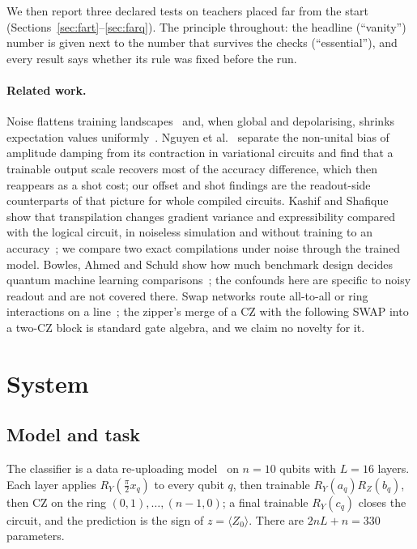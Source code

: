 \documentclass[11pt]{article}
\begin{document}
We then report three declared tests on teachers placed far from the start
(Sections~\ref{sec:fart}--\ref{sec:farq}). The principle throughout: the headline (``vanity'') number is given next to
the number that survives the checks (``essential''), and every result says whether its rule was fixed before the run.

\paragraph{Related work.} Noise flattens training landscapes~\cite{wang2021} and, when global and depolarising,
shrinks expectation values uniformly~\cite{vovrosh2021,urbanek2021}. Nguyen et al.~\cite{nguyen2026} separate the
non-unital bias of amplitude damping from its contraction in variational circuits and find that a trainable output
scale recovers most of the accuracy difference, which then reappears as a shot cost; our offset and shot findings
are the readout-side counterparts of that picture for whole compiled circuits. Kashif and Shafique show that
transpilation changes gradient variance and expressibility compared with the logical circuit, in noiseless
simulation and without training to an accuracy~\cite{kashif2026a,kashif2026b}; we compare two exact compilations
under noise through the trained model. Bowles, Ahmed and Schuld show how much benchmark design decides quantum machine
learning comparisons~\cite{bowles2024}; the confounds here are specific to noisy readout and are not covered there.
Swap networks route all-to-all or ring interactions on a line~\cite{ogorman2019,parella2025}; the zipper's merge of a
CZ with the following SWAP into a two-CZ block is standard gate algebra, and we claim no novelty for it.

\section{System}

\subsection{Model and task}

The classifier is a data re-uploading model~\cite{perez2020} on $n = 10$ qubits with $L = 16$ layers. Each layer applies
$R_Y(\tfrac{\pi}{2} x_q)$ to every qubit $q$, then trainable $R_Y(a_q) R_Z(b_q)$, then CZ on the ring $(0,1), \dots,
(n-1, 0)$; a final trainable $R_Y(c_q)$ closes the circuit, and the prediction is the sign of $z = \langle Z_0
\rangle$. There are $2nL + n = 330$ parameters.
\end{document}
